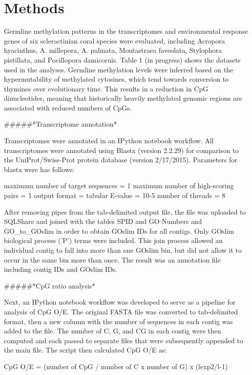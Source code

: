 \section{Methods}


Germline methylation patterns in the transcriptomes and environmental response genes of six scleractinian coral species were evaluated, including Acropora hyacinthus, A. millepora, A. palmata, Montastraea faveolata, Stylophora pistillata, and Pocillopora damicornis. Table 1 (in progress) shows the datasets used in the analyses. Germline methylation levels were inferred based on the hypermutability of methylated cytosines, which tend towards conversion to thymines over evolutionary time. This results in a reduction in CpG dinucleotides, meaning that historically heavily methylated genomic regions are associated with reduced numbers of CpGs. 

#####*Transcriptome annotation*

Transcriptomes were annotated in an IPython notebook workflow. All transcriptomes were annotated using Blastx (version 2.2.29) for comparison to the UniProt/Swiss-Prot protein database (version 2/17/2015). Parameters for blastx were has follows:

    maximum number of target sequences = 1
    maximum number of high-scoring pairs = 1
    output format = tabular
    E-value = 10-5
    number of threads = 8

After removing pipes from the tab-delimited output file, the file was uploaded to SQLShare and joined with the tables SPID and GO Numbers and GO_to_GOslim in order to obtain GOslim IDs for all contigs. Only GOslim biological process ('P') terms were included. This join process allowed an individual contig to fall into more than one GOslim bin, but did not allow it to occur in the same bin more than once. The result was an annotation file including contig IDs and GOslim IDs.

#####*CpG ratio analysis*

Next, an IPython notebook workflow was developed to serve as a pipeline for analysis of CpG O/E. The original FASTA file was converted to tab-delimited format, then a new column with the number of sequences in each contig was added to the file. The number of C, G, and CG in each contig were then computed and each passed to separate files that were subsequently appended to the main file. The script then calculated CpG O/E as:

CpG O/E = (number of CpG / number of C x number of G) x (lexp2/l-1)

